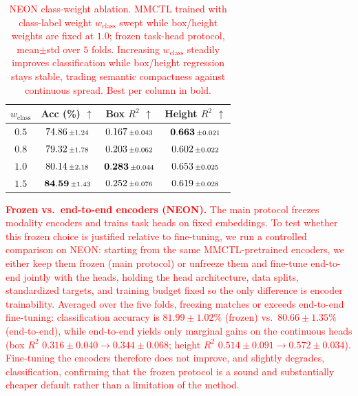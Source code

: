 \documentclass[10pt,twocolumn,letterpaper]{article}
\newcommand{\new}[1]{\textcolor{red}{#1}}
\begin{document}
\begin{table}[t]
\centering
\caption{\new{NEON class-weight ablation. MMCTL trained with class-label weight $w_{\text{class}}$ swept while box/height weights are fixed at $1.0$; frozen task-head protocol, mean$\pm$std over $5$ folds. Increasing $w_{\text{class}}$ steadily improves classification while box/height regression stays stable, trading semantic compactness against continuous spread. Best per column in bold.}}
\label{tab:neon_weight_ablation}
{\color{red}
\begin{tabular}{c c c c}
\toprule
$w_{\text{class}}$ & \textbf{Acc (\%)} $\uparrow$ & \textbf{Box $R^2$} $\uparrow$ & \textbf{Height $R^2$} $\uparrow$ \\
\midrule
$0.5$ & $74.86\,\scriptstyle\pm\,\!1.24$ & $0.167\,\scriptstyle\pm\,\!0.043$ & $\mathbf{0.663}\,\scriptstyle\pm\,\!0.021$ \\
$0.8$ & $79.32\,\scriptstyle\pm\,\!1.78$ & $0.203\,\scriptstyle\pm\,\!0.062$ & $0.602\,\scriptstyle\pm\,\!0.022$ \\
$1.0$ & $80.14\,\scriptstyle\pm\,\!2.18$ & $\mathbf{0.283}\,\scriptstyle\pm\,\!0.044$ & $0.653\,\scriptstyle\pm\,\!0.025$ \\
$1.5$ & $\mathbf{84.59}\,\scriptstyle\pm\,\!1.43$ & $0.252\,\scriptstyle\pm\,\!0.076$ & $0.619\,\scriptstyle\pm\,\!0.028$ \\
\bottomrule
\end{tabular}
}
\end{table}

\new{\noindent\textbf{Frozen vs.\ end-to-end encoders (NEON).}
The main protocol freezes modality encoders and trains task heads on fixed embeddings. To test whether this frozen choice is justified relative to fine-tuning, we run a controlled comparison on NEON: starting from the same MMCTL-pretrained encoders, we either keep them frozen (main protocol) or unfreeze them and fine-tune end-to-end jointly with the heads, holding the head architecture, data splits, standardized targets, and training budget fixed so the only difference is encoder trainability. Averaged over the five folds, freezing matches or exceeds end-to-end fine-tuning: classification accuracy is $81.99\pm1.02\%$ (frozen) vs.\ $80.66\pm1.35\%$ (end-to-end), while end-to-end yields only marginal gains on the continuous heads (box $R^2$ $0.316\pm0.040\rightarrow0.344\pm0.068$; height $R^2$ $0.514\pm0.091\rightarrow0.572\pm0.034$). Fine-tuning the encoders therefore does not improve, and slightly degrades, classification, confirming that the frozen protocol is a sound and substantially cheaper default rather than a limitation of the method.}
\end{document}
